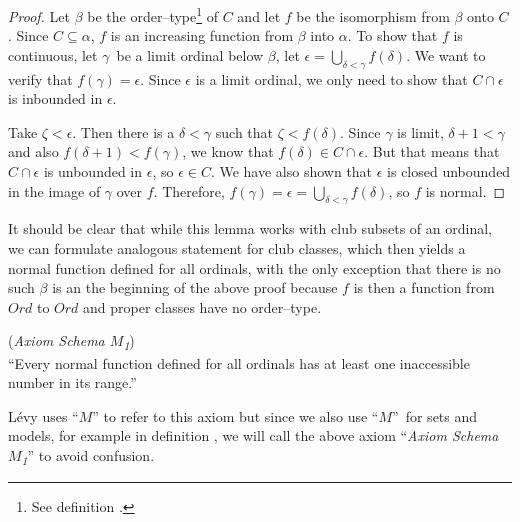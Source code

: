 \begin{proof}
Let $\beta$ be the order–type\footnote{See definition .} of $C$ and let $f$ be the isomorphism from $\beta$ onto $C$. Since $C \subseteq \alpha$, $f$ is an increasing function from $\beta$ into $\alpha$. To show that $f$ is continuous, let $\gamma$ be a limit ordinal below $\beta$, let $\epsilon = \bigcup_{\delta<\gamma} f(\delta)$. We want to verify that $f(\gamma) = \epsilon$. Since $\epsilon$ is a limit ordinal, we only need to show that $C \cap \epsilon$ is inbounded in $\epsilon$.

Take $\zeta < \epsilon$. Then there is a $\delta < \gamma$ such that $\zeta < f(\delta)$. 
Since $\gamma$ is limit, $\delta + 1 < \gamma$ and also $f(\delta + 1) < f(\gamma)$, we know that $f(\delta) \in C \cap \epsilon$. 
But that means that $C \cap \epsilon$ is unbounded in $\epsilon$, so $\epsilon \in C$. We have also shown that $\epsilon$ is closed unbounded in the image of $\gamma$ over $f$.
Therefore, $f(\gamma) = \epsilon = \bigcup_{\delta < \gamma} f(\delta)$, so $f$ is normal.
\end{proof}

It should be clear that while this lemma works with club subsets of an ordinal, we can formulate analogous statement for club classes, which then yields a normal function defined for all ordinals, with the only exception that there is no such $\beta$ is an the beginning of the above proof because $f$ is then a function from $Ord$ to $Ord$ and proper classes have no order–type.


\begin{definition}{(\emph{Axiom Schema $M$\textsubscript{1}})}\label{def:levy_m}\\
``Every normal function defined for all ordinals has at least one inaccessible number in its range.''
\end{definition}
Lévy uses ``$M$'' to refer to this axiom but since we also use ``$M$'' for sets and models, for example in definition , we will call the above axiom ``\emph{Axiom Schema $M$\textsubscript{1}}'' to avoid confusion.


